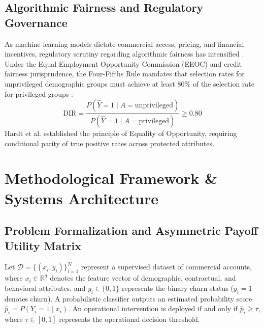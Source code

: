 \documentclass[journal,compsoc]{IEEEtran}
\begin{document}
\subsection{Algorithmic Fairness and Regulatory Governance}
As machine learning models dictate commercial access, pricing, and financial incentives, regulatory scrutiny regarding algorithmic fairness has intensified \cite{barocas2019fairness, dwork2012fairness, mehrabi2021survey}. Under the Equal Employment Opportunity Commission (EEOC) and credit fairness jurisprudence, the Four-Fifths Rule mandates that selection rates for unprivileged demographic groups must achieve at least 80\% of the selection rate for privileged groups \cite{feldman2015certifying}:
\begin{equation}
\text{DIR} = \frac{P(\hat{Y}=1 \mid A = \text{unprivileged})}{P(\hat{Y}=1 \mid A = \text{privileged})} \ge 0.80
\label{eq:dir}
\end{equation}
Hardt et al. \cite{hardt2016equality} established the principle of Equality of Opportunity, requiring conditional parity of true positive rates across protected attributes.

\section{Methodological Framework \& Systems Architecture}

\subsection{Problem Formalization and Asymmetric Payoff Utility Matrix}
Let $\mathcal{D} = \{(x_i, y_i)\}_{i=1}^N$ represent a supervised dataset of commercial accounts, where $x_i \in \mathbb{R}^d$ denotes the feature vector of demographic, contractual, and behavioral attributes, and $y_i \in \{0, 1\}$ represents the binary churn status ($y_i = 1$ denotes churn). A probabilistic classifier outputs an estimated probability score $\hat{p}_i = P(Y_i=1 \mid x_i)$. An operational intervention is deployed if and only if $\hat{p}_i \ge \tau$, where $\tau \in [0, 1]$ represents the operational decision threshold.
\end{document}
